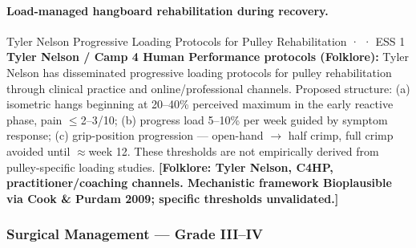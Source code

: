 \paragraph{Load-managed hangboard rehabilitation during recovery.}\leavevmode

\begin{folklorebox}{Tyler Nelson Progressive Loading Protocols for Pulley Rehabilitation · \folkloreverified · ESS 1}
\textbf{Tyler Nelson / Camp 4 Human Performance protocols (Folklore):} Tyler Nelson has disseminated progressive loading protocols for pulley rehabilitation through clinical practice and online/professional channels. Proposed structure: (a) isometric hangs beginning at 20--40\% perceived maximum in the early reactive phase, pain $\leq$2--3/10; (b) progress load 5--10\% per week guided by symptom response; (c) grip-position progression --- open-hand $\to$ half crimp, full crimp avoided until $\approx$week 12. These thresholds are not empirically derived from pulley-specific loading studies. \textbf{[Folklore: Tyler Nelson, C4HP, practitioner/coaching channels. Mechanistic framework Bioplausible via Cook \& Purdam 2009; specific thresholds unvalidated.]}
\end{folklorebox}

\subsubsection{Surgical Management --- Grade III--IV}

